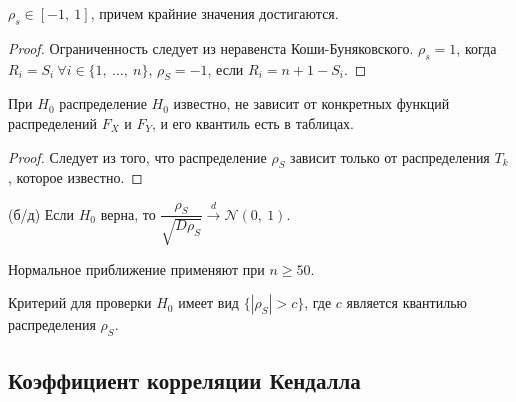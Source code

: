 \begin{proposition}
    $\displaystyle \rho _{s} \in [ -1,\ 1]$, причем крайние значения достигаются.
\end{proposition}
\begin{proof}
    Ограниченность следует из неравенста Коши-Буняковского. $\displaystyle \rho _{s} =1$, когда $\displaystyle R_{i} =S_{i} \ \forall i\in \{1,\ \dotsc ,\ n\}$, $\displaystyle \rho _{S} =-1$, если $\displaystyle R_{i} =n+1-S_{i}$.
\end{proof}
\begin{proposition}
    При $\displaystyle H_{0}$ распределение $\displaystyle H_{0}$ известно, не зависит от конкретных функций распределений $\displaystyle F_{X}$ и $\displaystyle F_{Y}$, и его квантиль есть в таблицах.
\end{proposition}
\begin{proof}
    Следует из того, что распределение $\displaystyle \rho _{S}$ зависит только от распределения $\displaystyle T_{k}$, которое известно.
\end{proof}
\begin{proposition}
    (б/д) Если $\displaystyle H_{0}$ верна, то $\displaystyle \dfrac{\rho _{S}}{\sqrt{D\rho _{S}}}\xrightarrow{d}\mathcal{N}( 0,\ 1)$.
\end{proposition}
\begin{note}
    Нормальное приближение применяют при $\displaystyle n\geqslant 50$.
\end{note}
Критерий для проверки $\displaystyle H_{0}$ имеет вид $\displaystyle \{| \rho _{S}|  >c\}$, где $\displaystyle c$ является квантилью распределения $\displaystyle \rho _{S}$.
\subsection{Коэффициент корреляции Кендалла}

